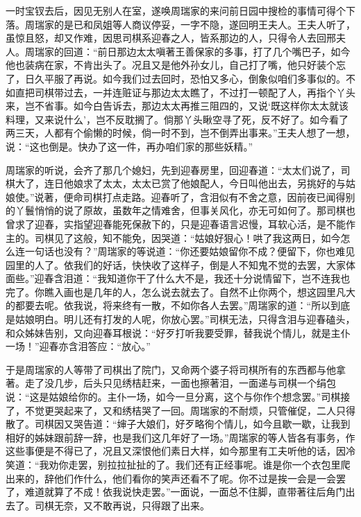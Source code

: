 \begin{parag}
    一时宝钗去后，因见无别人在室，遂唤周瑞家的来问前日园中搜检的事情可得个下落。周瑞家的是已和凤姐等人商议停妥，一字不隐，遂回明王夫人。王夫人听了，虽惊且怒，却又作难，因思司棋系迎春之人，皆系那边的人，只得令人去回邢夫人。周瑞家的回道：“前日那边太太嗔著王善保家的多事，打了几个嘴巴子，如今他也装病在家，不肯出头了。况且又是他外孙女儿，自己打了嘴，他只好装个忘了，日久平服了再说。如今我们过去回时，恐怕又多心，倒象似咱们多事似的。不如直把司棋带过去，一并连赃证与那边太太瞧了，不过打一顿配了人，再指个丫头来，岂不省事。如今白告诉去，那边太太再推三阻四的，又说‘既这样你太太就该料理，又来说什么’，岂不反耽搁了。倘那丫头瞅空寻了死，反不好了。如今看了两三天，人都有个偷懒的时候，倘一时不到，岂不倒弄出事来。”王夫人想了一想，说：“这也倒是。快办了这一件，再办咱们家的那些妖精。”
\end{parag}


\begin{parag}
    周瑞家的听说，会齐了那几个媳妇，先到迎春房里，回迎春道：“太太们说了，司棋大了，连日他娘求了太太，太太已赏了他娘配人，今日叫他出去，另挑好的与姑娘使。”说著，便命司棋打点走路。迎春听了，含泪似有不舍之意，因前夜已闻得别的丫鬟悄悄的说了原故，虽数年之情难舍，但事关风化，亦无可如何了。那司棋也曾求了迎春，实指望迎春能死保赦下的，只是迎春语言迟慢，耳软心活，是不能作主的。司棋见了这般，知不能免，因哭道：“姑娘好狠心！哄了我这两日，如今怎么连一句话也没有？”周瑞家的等说道：“你还要姑娘留你不成？便留下，你也难见园里的人了。依我们的好话，快快收了这样子，倒是人不知鬼不觉的去罢，大家体面些。”迎春含泪道：“我知道你干了什么大不是，我还十分说情留下，岂不连我也完了。你瞧入画也是几年的人，怎么说去就去了。自然不止你两个，想这园里凡大的都要去呢。依我说，将来终有一散，不如你各人去罢。”周瑞家的道：“所以到底是姑娘明白。明儿还有打发的人呢，你放心罢。”司棋无法，只得含泪与迎春磕头，和众姊妹告别，又向迎春耳根说：“好歹打听我要受罪，替我说个情儿，就是主仆一场！”迎春亦含泪答应：“放心。”
\end{parag}


\begin{parag}
    于是周瑞家的人等带了司棋出了院门，又命两个婆子将司棋所有的东西都与他拿著。走了没几步，后头只见绣桔赶来，一面也擦著泪，一面递与司棋一个绢包说：“这是姑娘给你的。主仆一场，如今一旦分离，这个与你作个想念罢。”司棋接了，不觉更哭起来了，又和绣桔哭了一回。周瑞家的不耐烦，只管催促，二人只得散了。司棋因又哭告道：“婶子大娘们，好歹略徇个情儿，如今且歇一歇，让我到相好的姊妹跟前辞一辞，也是我们这几年好了一场。”周瑞家的等人皆各有事务，作这些事便是不得已了，况且又深恨他们素日大样，如今那里有工夫听他的话，因冷笑道：“我劝你走罢，别拉拉扯扯的了。我们还有正经事呢。谁是你一个衣包里爬出来的，辞他们作什么，他们看你的笑声还看不了呢。你不过是挨一会是一会罢了，难道就算了不成！依我说快走罢。”一面说，一面总不住脚，直带著往后角门出去了。司棋无奈，又不敢再说，只得跟了出来。
\end{parag}


